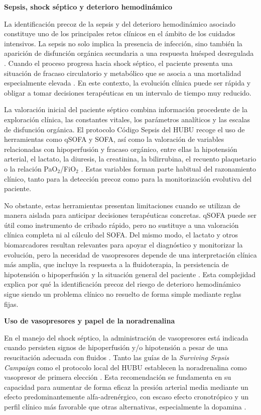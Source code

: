 
\textbf{Sepsis, shock séptico y deterioro hemodinámico}

La identificación precoz de la sepsis y del deterioro hemodinámico asociado constituye uno de los principales retos clínicos en el ámbito de los cuidados intensivos. La sepsis no solo implica la presencia de infección, sino también la aparición de disfunción orgánica secundaria a una respuesta huésped desregulada \cite{singer2016}. Cuando el proceso progresa hacia shock séptico, el paciente presenta una situación de fracaso circulatorio y metabólico que se asocia a una mortalidad especialmente elevada \cite{singer2016}. En este contexto, la evolución clínica puede ser rápida y obligar a tomar decisiones terapéuticas en un intervalo de tiempo muy reducido.

La valoración inicial del paciente séptico combina información procedente de la exploración clínica, las constantes vitales, los parámetros analíticos y las escalas de disfunción orgánica. El protocolo Código Sepsis del HUBU recoge el uso de herramientas como qSOFA y SOFA, así como la valoración de variables relacionadas con hipoperfusión y fracaso orgánico, entre ellas la hipotensión arterial, el lactato, la diuresis, la creatinina, la bilirrubina, el recuento plaquetario o la relación PaO$_2$/FiO$_2$ \cite{hubu2025}. Estas variables forman parte habitual del razonamiento clínico, tanto para la detección precoz como para la monitorización evolutiva del paciente.

No obstante, estas herramientas presentan limitaciones cuando se utilizan de manera aislada para anticipar decisiones terapéuticas concretas. qSOFA puede ser útil como instrumento de cribado rápido, pero no sustituye a una valoración clínica completa ni al cálculo del SOFA. Del mismo modo, el lactato y otros biomarcadores resultan relevantes para apoyar el diagnóstico y monitorizar la evolución, pero la necesidad de vasopresores depende de una interpretación clínica más amplia, que incluye la respuesta a la fluidoterapia, la persistencia de hipotensión o hipoperfusión y la situación general del paciente \cite{hubu2025}. Esta complejidad explica por qué la identificación precoz del riesgo de deterioro hemodinámico sigue siendo un problema clínico no resuelto de forma simple mediante reglas fijas.

\textbf{Uso de vasopresores y papel de la noradrenalina}

En el manejo del shock séptico, la administración de vasopresores está indicada cuando persisten signos de hipoperfusión y/o hipotensión a pesar de una resucitación adecuada con fluidos \cite{evans2021,hubu2025}. Tanto las guías de la \textit{Surviving Sepsis Campaign} como el protocolo local del HUBU establecen la noradrenalina como vasopresor de primera elección \cite{evans2021,hubu2025}. Esta recomendación se fundamenta en su capacidad para aumentar de forma eficaz la presión arterial media mediante un efecto predominantemente alfa-adrenérgico, con escaso efecto cronotrópico y un perfil clínico más favorable que otras alternativas, especialmente la dopamina \cite{evans2021}.

